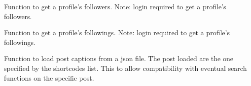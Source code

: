 \documentclass[letterpaper,10pt,english]{sphinxmanual}
\begin{document}
\begin{fulllineitems}
\begin{fulllineitems}
\label{\detokenize{app.services:app.services.ig_scraping.GetInstagramProfile.get_users_followers}}
\pysigstartsignatures
{}
\pysigstopsignatures
\sphinxAtStartPar
Function to get a profile’s followers.
Note: login required to get a profile’s followers.

\end{fulllineitems}


\begin{fulllineitems}
\label{\detokenize{app.services:app.services.ig_scraping.GetInstagramProfile.get_users_followings}}
\pysigstartsignatures
{}
\pysigstopsignatures
\sphinxAtStartPar
Function to get a profile’s followings.
Note: login required to get a profile’s followings.

\end{fulllineitems}


\end{fulllineitems}


\begin{fulllineitems}
\label{\detokenize{app.services:app.services.ig_scraping.load_post_captions_from_json}}
\pysigstartsignatures
{}
\pysigstopsignatures
\sphinxAtStartPar
Function to load post captions from a json file. The post loaded are the one specified by the shortcodes list.
This to allow compatibility with eventual search functions on the specific post.

\end{fulllineitems}
\end{document}
